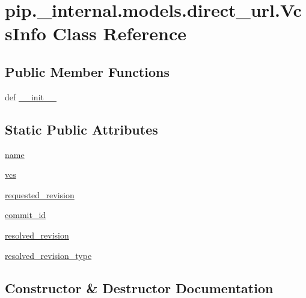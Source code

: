 \hypertarget{classpip_1_1__internal_1_1models_1_1direct__url_1_1VcsInfo}{}\section{pip.\+\_\+internal.\+models.\+direct\+\_\+url.\+Vcs\+Info Class Reference}
\label{classpip_1_1__internal_1_1models_1_1direct__url_1_1VcsInfo}
\subsection*{Public Member Functions}
\begin{DoxyCompactItemize}
\item 
def \hyperlink{classpip_1_1__internal_1_1models_1_1direct__url_1_1VcsInfo_a3aabd65211a0f2566025e1f657480596}{\+\_\+\+\_\+init\+\_\+\+\_\+}
\end{DoxyCompactItemize}
\subsection*{Static Public Attributes}
\begin{DoxyCompactItemize}
\item 
\hyperlink{classpip_1_1__internal_1_1models_1_1direct__url_1_1VcsInfo_a1e77e6001b34d3c356c60ec6c65e908c}{name}
\item 
\hyperlink{classpip_1_1__internal_1_1models_1_1direct__url_1_1VcsInfo_a9521bc8384f69befd657f9d16fbfec71}{vcs}
\item 
\hyperlink{classpip_1_1__internal_1_1models_1_1direct__url_1_1VcsInfo_a76b37e6ca00ba6963675115b34cec5a3}{requested\+\_\+revision}
\item 
\hyperlink{classpip_1_1__internal_1_1models_1_1direct__url_1_1VcsInfo_ac8d708f1f62566071e4965a12fc89137}{commit\+\_\+id}
\item 
\hyperlink{classpip_1_1__internal_1_1models_1_1direct__url_1_1VcsInfo_a6133ddef49045811bac405214e66abc4}{resolved\+\_\+revision}
\item 
\hyperlink{classpip_1_1__internal_1_1models_1_1direct__url_1_1VcsInfo_ab256881e83787ec6ad5924bcf0d5a219}{resolved\+\_\+revision\+\_\+type}
\end{DoxyCompactItemize}


\subsection{Constructor \& Destructor Documentation}
\mbox{\label{classpip_1_1__internal_1_1models_1_1direct__url_1_1VcsInfo_a3aabd65211a0f2566025e1f657480596}} 
